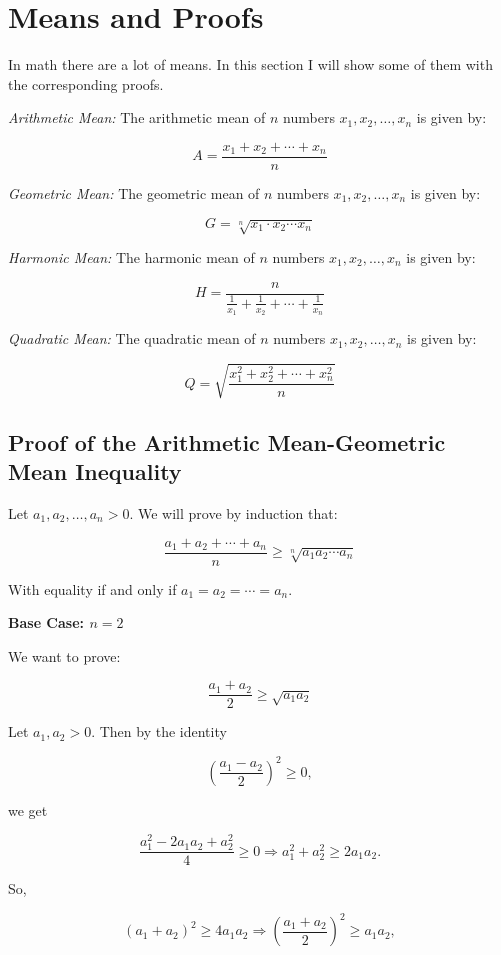 \newpage
\section{Means and Proofs}
In math there are a lot of means. In this section I will show some of them with the corresponding proofs.

\emph{Arithmetic Mean:} The arithmetic mean of \(n\) numbers \( x_1, x_2, \dots, x_n \) is given by:

\[
	A = \frac{x_1 + x_2 + \cdots + x_n}{n}
\]

\emph{Geometric Mean:} The geometric mean of \(n\) numbers \( x_1, x_2, \dots, x_n \) is given by:

\[
	G = \sqrt[n]{x_1 \cdot x_2 \cdots x_n}
\]

\emph{Harmonic Mean:} The harmonic mean of \(n\) numbers \( x_1, x_2, \dots, x_n \) is given by:

\[
	H = \frac{n}{\frac{1}{x_1} + \frac{1}{x_2} + \cdots + \frac{1}{x_n}}
\]

\emph{Quadratic Mean:} The quadratic mean of \(n\) numbers \( x_1, x_2, \dots, x_n \) is given by:
	      
\[
	Q = \sqrt{\frac{x_1^2 + x_2^2 + \cdots + x_n^2}{n}}
\]

\subsection{Proof of the Arithmetic Mean-Geometric Mean Inequality}

Let \( a_1, a_2, \dots, a_n > 0 \). We will prove by induction that:

\[
	\frac{a_1 + a_2 + \cdots + a_n}{n} \geq \sqrt[n]{a_1 a_2 \cdots a_n}
\]

With equality if and only if \( a_1 = a_2 = \cdots = a_n \).

\textbf{Base Case: \( n = 2 \)}

We want to prove:

\[
	\frac{a_1 + a_2}{2} \geq \sqrt{a_1 a_2}
\]

Let \( a_1, a_2 > 0 \). Then by the identity

\[
	{\left( \frac{a_1 - a_2}{2} \right)}^2 \geq 0,
\]

we get

\[
	\frac{a_1^2 - 2a_1a_2 + a_2^2}{4} \geq 0 \Rightarrow a_1^2 + a_2^2 \geq 2a_1a_2.
\]

So,

\[
	{(a_1 + a_2)}^2 \geq 4a_1a_2 \Rightarrow {\left( \frac{a_1 + a_2}{2} \right)}^2 \geq a_1a_2,
\]

